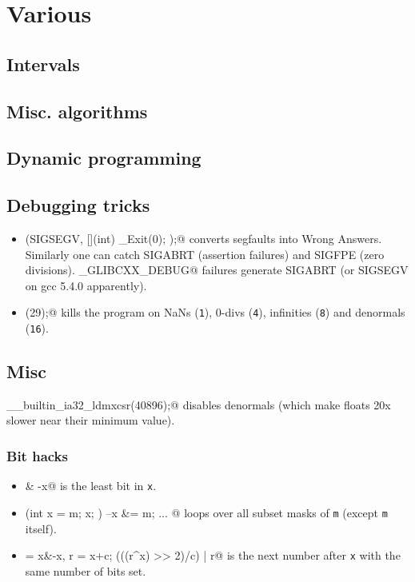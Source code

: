 \chapter{Various}

\section{Intervals}

\section{Misc. algorithms}

\section{Dynamic programming}

\section{Debugging tricks}
	\begin{itemize}
		\item \verb@signal(SIGSEGV, [](int) { _Exit(0); });@ converts segfaults into Wrong Answers.
			Similarly one can catch SIGABRT (assertion failures) and SIGFPE (zero divisions).
			\verb@_GLIBCXX_DEBUG@ failures generate SIGABRT (or SIGSEGV on gcc 5.4.0 apparently).
		\item \verb@feenableexcept(29);@ kills the program on NaNs (\texttt 1), 0-divs (\texttt 4), infinities (\texttt 8) and denormals (\texttt{16}).
	\end{itemize}

\section{Misc}
	\verb@__builtin_ia32_ldmxcsr(40896);@ disables denormals (which make floats 20x slower near their minimum value).
	\subsection{Bit hacks}
		\begin{itemize}
			\item \verb@x & -x@ is the least bit in \texttt{x}.
			\item \verb@for (int x = m; x; ) { --x &= m; ... }@ loops over all subset masks of \texttt{m} (except \texttt{m} itself).
			\item \verb@c = x&-x, r = x+c; (((r^x) >> 2)/c) | r@ is the next number after \texttt{x} with the same number of bits set.
		\end{itemize}
